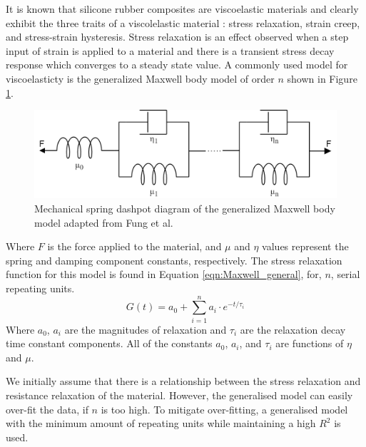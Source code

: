 It is known that silicone rubber composites are viscoelastic materials and clearly exhibit the three traits of a viscolelastic material \cite{Fung1993}: stress relaxation, strain creep, and stress-strain hysteresis. Stress relaxation is an effect observed when a step input of strain is applied to a material and there is a transient stress decay response which converges to a steady state value. A commonly used model for viscoelasticty is the generalized Maxwell body model of order $n$ shown in Figure \ref{fig:Maxwell_general}.
\begin{figure}[H]
	\centering
	\includegraphics[width=0.7\linewidth]{Figures/Generlised_Maxwell_body.png}
	\caption{Mechanical spring dashpot diagram of the generalized Maxwell body model adapted from Fung et al. \cite{Fung1993}}
	\label{fig:Maxwell_general}
\end{figure}
Where $F$ is the force applied to the material, and $\mu$ and $\eta$ values represent the spring and damping component constants, respectively. The stress relaxation function for this model is found in Equation \ref{eqn:Maxwell_general}, for, $n$, serial repeating units. 
\begin{equation}
	G(t) = a_0 + \sum^n_{i=1} a_i \cdot e^{-t/\tau_i}
	\label{eqn:Maxwell_general} 
\end{equation}
Where $a_0$, $a_i$ are the magnitudes of relaxation and $\tau_i$ are the relaxation decay time constant components. All of the constants $a_0$, $a_i$, and $\tau_i$ are functions of $\eta$ and $\mu$. 

We initially assume that there is a relationship between the stress relaxation and resistance relaxation of the material. However, the generalised model can easily over-fit the data, if $n$ is too high. To mitigate over-fitting, a generalised model with the minimum amount of repeating units while maintaining a high $R^2$ is used.

